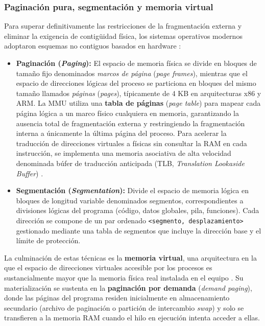 \documentclass[12pt]{article}
\begin{document}
\subsubsection{Paginación pura, segmentación y memoria virtual}
Para superar definitivamente las restricciones de la fragmentación externa y eliminar la exigencia de contigüidad física, los sistemas operativos modernos adoptaron esquemas no contiguos basados en hardware \parencite[\S 7.3--7.4, pp.\ 328--345]{stallings2018operating}:
\begin{itemize}[leftmargin=*]
    \item \textbf{Paginación (\textit{Paging}):} El espacio de memoria física se divide en bloques de tamaño fijo denominados \textit{marcos de página} (\textit{page frames}), mientras que el espacio de direcciones lógicas del proceso se particiona en bloques del mismo tamaño llamados \textit{páginas} (\textit{pages}), típicamente de 4 KB en arquitecturas x86 y ARM. La MMU utiliza una \textbf{tabla de páginas} (\textit{page table}) para mapear cada página lógica a un marco físico cualquiera en memoria, garantizando la ausencia total de fragmentación externa y restringiendo la fragmentación interna a únicamente la última página del proceso. Para acelerar la traducción de direcciones virtuales a físicas sin consultar la RAM en cada instrucción, se implementa una memoria asociativa de alta velocidad denominada búfer de traducción anticipada (TLB, \textit{Translation Lookaside Buffer}) \parencite[\S 8.4, pp.\ 288--293]{silberschatz2006fundamentos}.
    
    \item \textbf{Segmentación (\textit{Segmentation}):} Divide el espacio de memoria lógica en bloques de longitud variable denominados segmentos, correspondientes a divisiones lógicas del programa (código, datos globales, pila, funciones). Cada dirección se compone de un par ordenado \texttt{<segmento, desplazamiento>} gestionado mediante una tabla de segmentos que incluye la dirección base y el límite de protección.
\end{itemize}

La culminación de estas técnicas es la \textbf{memoria virtual}, una arquitectura en la que el espacio de direcciones virtuales accesible por los procesos es sustancialmente mayor que la memoria física real instalada en el equipo \parencite[\S 8.1, pp.\ 358--363]{stallings2018operating}. Su materialización se sustenta en la \textbf{paginación por demanda} (\textit{demand paging}), donde las páginas del programa residen inicialmente en almacenamiento secundario (archivo de paginación o partición de intercambio \textit{swap}) y solo se transfieren a la memoria RAM cuando el hilo en ejecución intenta acceder a ellas. 
\end{document}
